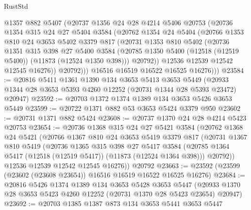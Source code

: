 \begin{lexlean}{RustStd}
\begin{coremodule}
            @1357
            @882
            @5407
            (@20737
              @1356
              @24
              @28
              @4214
              @5406
              @20753
              (@20736
                @1354
                @315
                @24
                @27
                @5404
                @3584
                (@20762
                  @1354
                  @24
                  @5404
                  (@20766
                    @1353
                    @810
                    @24
                    @3653
                    @5402
                    @3379
                    @817
                    (@20731
                      @1353
                      @810
                      @5402
                      (@20736
                        @1351
                        @315
                        @398
                        @27
                        @5400
                        @3584
                        (@20785 @1350 @5400 (@12518 (@12519 @5400)) (@11873 (@12524 @1350 @398)))
                        @20792))
                    @12536
                    @12539
                    @12542
                    @12545
                    @16276))
                @20792)))
          @16516
          @16519
          @16522
          @16525
          @16276)))
@23584 := @20816
    @5411
    @1361
    @1390
    @134
    @3653
    @5413
    @3653
    @5449
    (@20933 @1344 @28 @3653 @5393 @4260 @12252 (@20731 @1344 @28 @5393 @23472) @20947)
@23592 := @20703 @1372 @1374 @1389 @134 @3653 @5426 @3653 @5449
@23599 := @20722 @1371 @882 @53 @3653 @5424 @3379 @950
@23602 := @20731 @1371 @882 @5424
@23608 := @20737 @1370 @24 @28 @4214 @5423 @20753
@23654 := @20736
    @1368
    @315
    @24
    @27
    @5421
    @3584
    (@20762
      @1368
      @24
      @5421
      (@20766
        @1367
        @810
        @24
        @3653
        @5419
        @3379
        @817
        (@20731
          @1367
          @810
          @5419
          (@20736
            @1365
            @315
            @398
            @27
            @5417
            @3584
            (@20785 @1364 @5417 (@12518 (@12519 @5417)) (@11873 (@12524 @1364 @398)))
            @20792))
        @12536
        @12539
        @12542
        @12545
        @16276))
    @20792
@23663 := @23592 (@23599 (@23602 (@23608 @23654)) @16516 @16519 @16522 @16525 @16276)
@23684 := @20816
    @5426
    @1374
    @1389
    @134
    @3653
    @5428
    @3653
    @5447
    (@20933 @1370 @28 @3653 @5423 @4260 @12252 (@20731 @1370 @28 @5423 @23654) @20947)
@23692 := @20703 @1385 @1387 @873 @134 @3653 @5441 @3653 @5447

\end{coremodule}
\end{lexlean}
